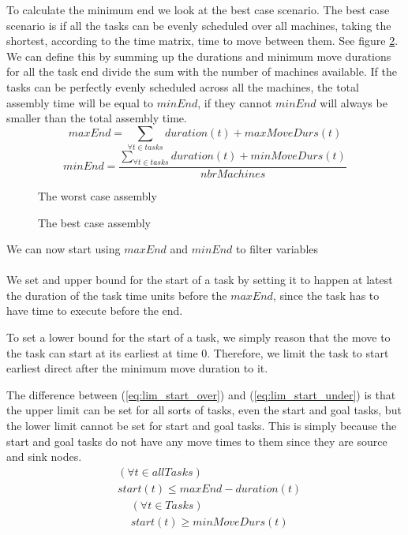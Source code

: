    To calculate the minimum end we look at the best case scenario. The best case scenario is if all the tasks can be evenly scheduled over all machines, taking the shortest, according to the time matrix, time to move between them. See figure \ref{fig:best_case}. We can define this by summing up the durations and minimum move durations for all the task end divide the sum with the number of machines available. If the tasks can be perfectly evenly scheduled across all the machines, the total assembly time will be equal to $minEnd$, if they cannot $minEnd$ will always be smaller than the total assembly time.
  \begin{equation}\label{eq:59}
 	maxEnd = \sum_{\forall t \in tasks} duration(t) + maxMoveDurs(t)
  \end{equation}
  \begin{equation}\label{eq:minEnd}
  	minEnd = \frac{\sum_{\forall t \in tasks} duration(t) + minMoveDurs(t)}{nbrMachines}
  \end{equation}

 
  \begin{figure}
  	\centering
  	
  	\caption{The worst case assembly}
  	\label{fig:worst_case}
  \end{figure}
   \begin{figure}
   	\centering
   	
   	\caption{The best case assembly}
   	\label{fig:best_case}
   \end{figure}
 
 \noindent We can now start using $maxEnd$ and $minEnd$ to filter variables
 \\\\
  We set and upper bound for the start of a task by setting it to happen at latest the duration of the task time units before the $maxEnd$, since the task has to have time to execute before the end.
  
  To set a lower bound for the start of a task, we simply reason that the move to the task can start at its earliest at time 0. Therefore, we limit the task to start earliest direct after the minimum move duration to it.
  
  The difference between (\ref{eq:lim_start_over}) and (\ref{eq:lim_start_under}) is that the upper limit can be set for all sorts of tasks, even the start and goal tasks, but the lower limit cannot be set for start and goal tasks. This is simply because the start and goal tasks do not have any move times to them since they are source and sink nodes.
  \begin{equation}\label{eq:lim_start_over}
  \begin{aligned}
 &(\forall t \in allTasks)\\
 &start(t) \le maxEnd-duration(t)
  \end{aligned}
  \end{equation}
   \begin{equation}\label{eq:lim_start_under}
  \begin{aligned}
 &(\forall t \in Tasks)\\
 &start(t) \ge minMoveDurs(t)
  \end{aligned}
  \end{equation}

